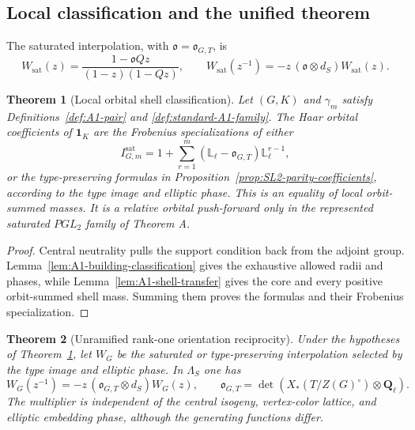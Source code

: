 \documentclass[11pt]{article}
\newtheorem{theorem}{Theorem}[section]
\theoremstyle{definition}
\theoremstyle{remark}
\newcommand{\Qell}{\mathbf Q_\ell}
\newcommand{\Lell}{\mathbb L_{\ell}}
\newcommand{\one}{\mathbf 1}
\begin{document}
\subsection{Local classification and the unified theorem}

The saturated interpolation, with $\mathfrak o=\mathfrak o_{G,T}$, is
\begin{equation}
 W_{\mathrm{sat}}(z)
 =\frac{1-\mathfrak o Qz}{(1-z)(1-Qz)},
 \qquad
 W_{\mathrm{sat}}(z^{-1})
 =-z\,(\mathfrak o\otimes d_S)W_{\mathrm{sat}}(z).
 \label{eq:A1-saturated-reciprocity}
\end{equation}

\begin{theorem}[Local orbital shell classification]
\label{thm:A1-local-shell-classification}
Let $(G,K)$ and $\gamma_m$ satisfy Definitions~\ref{def:A1-pair} and
\ref{def:standard-A1-family}.  The Haar orbital coefficients of $\one_K$ are
the Frobenius specializations of either
\begin{equation}
 I_{G,m}^{\mathrm{sat}}
 =1+\sum_{r=1}^m(\Lell-\mathfrak o_{G,T})\Lell^{r-1},
 \label{eq:A1-saturated-shell-class}
\end{equation}
or the type-preserving formulas in
Proposition~\ref{prop:SL2-parity-coefficients}, according to the type image
and elliptic phase.  This is an equality of local orbit-summed masses.  It is
a relative orbital push-forward only in the represented saturated $PGL_2$
family of Theorem A.
\end{theorem}

\begin{proof}
Central neutrality pulls the support condition back from the adjoint group.
Lemma~\ref{lem:A1-building-classification} gives the exhaustive allowed
radii and phases, while Lemma~\ref{lem:A1-shell-transfer} gives the core and
every positive orbit-summed shell mass.  Summing them proves the formulas and
their Frobenius specialization.
\end{proof}

\begin{theorem}[Unramified rank-one orientation reciprocity]
\label{thm:A1-orientation-reciprocity}
Under the hypotheses of Theorem~\ref{thm:A1-local-shell-classification}, let
$W_G$ be the saturated or type-preserving interpolation selected by the type
image and elliptic phase.  In $\Lambda_S$ one has
\begin{equation}
 \boxed{
 W_G(z^{-1})
 =-z\,(\mathfrak o_{G,T}\otimes d_S)W_G(z),
 \qquad
 \mathfrak o_{G,T}
 =\det\!\left(X_*(T/Z(G)^\circ)\otimes\Qell\right).}
 \label{eq:A1-orientation-reciprocity}
\end{equation}
The multiplier is independent of the central isogeny, vertex-color lattice,
and elliptic embedding phase, although the generating functions differ.
\end{theorem}
\end{document}
